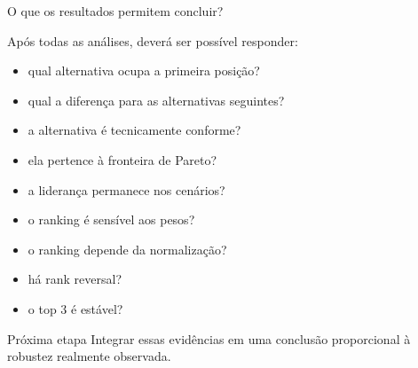 \begin{frame}{O que os resultados permitem concluir?}

    Após todas as análises, deverá ser possível responder:

    \begin{itemize}
        \item qual alternativa ocupa a primeira posição?
        \item qual a diferença para as alternativas seguintes?
        \item a alternativa é tecnicamente conforme?
        \item ela pertence à fronteira de Pareto?
        \item a liderança permanece nos cenários?
        \item o ranking é sensível aos pesos?
        \item o ranking depende da normalização?
        \item há rank reversal?
        \item o top 3 é estável?
    \end{itemize}

    \vspace{0.3cm}

    \begin{block}{Próxima etapa}
        Integrar essas evidências em uma conclusão proporcional à
        robustez realmente observada.
    \end{block}

\end{frame}


%
%
%
%
%
%
%
%


%
%
%
%
%
%


